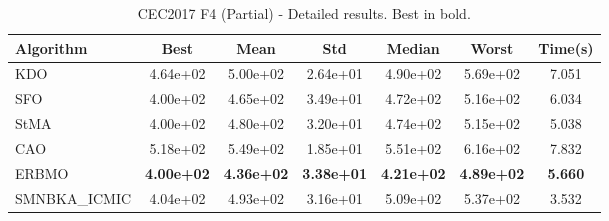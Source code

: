 \begin{table}[H]
\centering\small
\caption{CEC2017 F4 (Partial) - Detailed results. Best in bold.}
\label{tab:cec2017_F4}
\begin{tabular}{lcccccc}
\toprule
\textbf{Algorithm} & \textbf{Best} & \textbf{Mean} & \textbf{Std} & \textbf{Median} & \textbf{Worst} & \textbf{Time(s)} \\
\midrule
KDO & 4.64e+02 & 5.00e+02 & 2.64e+01 & 4.90e+02 & 5.69e+02 & 7.051 \\
SFO & 4.00e+02 & 4.65e+02 & 3.49e+01 & 4.72e+02 & 5.16e+02 & 6.034 \\
StMA & 4.00e+02 & 4.80e+02 & 3.20e+01 & 4.74e+02 & 5.15e+02 & 5.038 \\
CAO & 5.18e+02 & 5.49e+02 & 1.85e+01 & 5.51e+02 & 6.16e+02 & 7.832 \\
ERBMO & \textbf{4.00e+02} & \textbf{4.36e+02} & \textbf{3.38e+01} & \textbf{4.21e+02} & \textbf{4.89e+02} & \textbf{5.660} \\
SMNBKA_ICMIC & 4.04e+02 & 4.93e+02 & 3.16e+01 & 5.09e+02 & 5.37e+02 & 3.532 \\
\bottomrule
\end{tabular}
\end{table}

